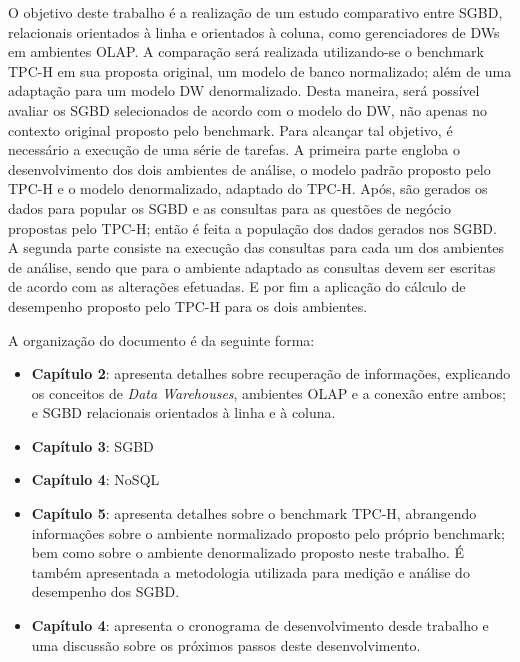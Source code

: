O objetivo deste trabalho é a realização de um estudo comparativo entre SGBD, relacionais orientados à linha e orientados à coluna, 
como gerenciadores de DWs em ambientes OLAP. A comparação será realizada utilizando-se o benchmark TPC-H em sua proposta original, um modelo de banco normalizado; 
além de uma adaptação para um modelo DW denormalizado. Desta maneira, será possível avaliar os SGBD selecionados de acordo com o modelo do DW, não apenas no 
contexto original proposto pelo benchmark. Para alcançar tal objetivo, é necessário a execução de uma série de tarefas. A primeira parte engloba o 
desenvolvimento dos dois ambientes de análise, o modelo padrão proposto pelo TPC-H e o modelo denormalizado, adaptado do TPC-H. Após, são gerados os 
dados para popular os SGBD e as consultas para as questões de negócio propostas pelo TPC-H; então é feita a população dos dados gerados nos SGBD. 
A segunda parte consiste na execução das consultas para cada um dos ambientes de análise, sendo que para o ambiente adaptado as consultas devem 
ser escritas de acordo com as alterações efetuadas. E por fim a aplicação do cálculo de desempenho proposto pelo TPC-H para os dois ambientes. 

A organização do documento é da seguinte forma:

\begin{itemize}
	\item \textbf{Capítulo 2}: apresenta detalhes sobre recuperação de informações, explicando os conceitos de \textit{Data Warehouses}, 
	ambientes OLAP e a conexão entre ambos; e SGBD relacionais orientados à linha e à coluna.
	\item \textbf{Capítulo 3}: SGBD
	\item \textbf{Capítulo 4}: NoSQL
	\item \textbf{Capítulo 5}: apresenta detalhes sobre o benchmark TPC-H, abrangendo informações sobre o ambiente normalizado proposto pelo próprio benchmark; 
	bem como sobre o ambiente denormalizado proposto neste trabalho. É também apresentada a metodologia utilizada para medição e análise do desempenho dos SGBD.
	\item \textbf{Capítulo 4}: apresenta o cronograma de desenvolvimento desde trabalho e uma discussão sobre os próximos passos deste desenvolvimento.
\end{itemize}


